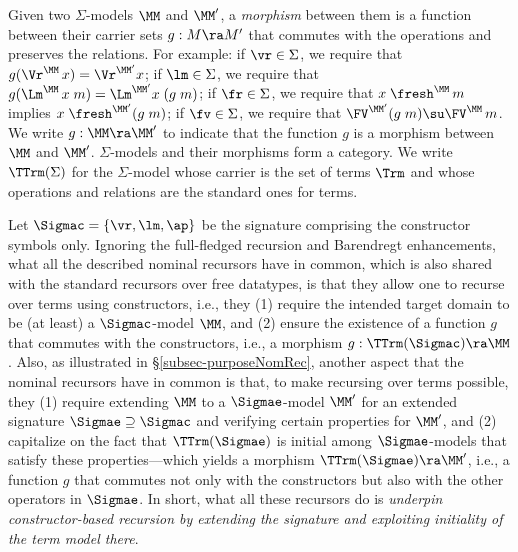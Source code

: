 Given two $\Sigma$-models $\MM$ and $\MM'$, a \emph{morphism} 
between them is a function  between their carrier sets $g: M \ra M'$
that commutes with the operations and preserves the relations. For example: 
%
 if $\vr \in \Sigma$, we require that $g(\Vr^\MM\,x) = \Vr^{\MM'}x$; %
 if $\lm \in \Sigma$, we require that $g(\Lm^\MM\,x\;m) = \Lm^{\MM'}x\;(g\;m)$;  
if $\fr \in \Sigma$, we require that 
	$x\;\fresh^\MM\, m$ implies $x\;\fresh^{\MM'} (g\;m)$; %
if $\fv \in \Sigma$, we require that 
$\FV^{\MM'}(g\;m) \su \FV^\MM\, m$.  
%
We write $g: \MM \ra \MM'$ to indicate that the function $g$ is a morphism between $\MM$ and $\MM'$. 
%
%
$\Sigma$-models and their morphisms form a category. 
%
We write $\TTrm(\Sigma)$ for the $\Sigma$-model whose carrier is the set of terms $\Trm$ and whose operations and relations are the standard ones for terms. 

Let $\Sigmac = \{\vr,\lm,\ap\}$ be the signature comprising the %
constructor symbols only.  %
Ignoring the full-fledged recursion and Barendregt %
enhancements, %
what all the described nominal recursors have in common, which is also shared with the standard recursors over free datatypes, is that they allow one to recurse over terms using %
constructors, i.e., they  
(1) require the intended target domain to be (at least) a $\Sigmac$-model $\MM$,  and (2) ensure the existence of a function $g$ that commutes with the constructors, i.e., %
a 
morphism $g: \TTrm(\Sigmac) \ra \MM$. 
%
Also, as illustrated in  \S\ref{subsec-purposeNomRec}, another aspect that the nominal recursors have in common is that, to make recursing over terms possible, %
they (1) require extending $\MM$ to a $\Sigmae$-model $\MM'$ 
for an extended signature $\Sigmae \supseteq \Sigmac$ and verifying certain  
properties for $\MM'$, and (2) capitalize on the fact that $\TTrm(\Sigmae)$ is initial among  $\Sigmae$-models that satisfy these properties---which yields a morphism $\TTrm(\Sigmae) \ra \MM'$, i.e., a function $g$ that commutes not only with the constructors but also with the other %
operators in $\Sigmae$. 
%
In short, what all these recursors do is \emph{underpin %
constructor-based recursion by extending the signature and exploiting initiality of the term model there}. 


